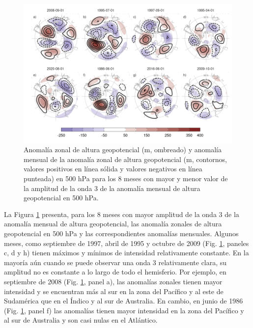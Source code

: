 \documentclass[12pt,oneside,a4paper]{reedthesis}
\begin{document}
\begin{figure}

{\centering \includegraphics{figures/15-onda3/zw3-top8-1} 

}

\caption{Anomalía zonal de altura geopotencial (m, ombreado) y anomalía mensual de la anomalía zonal de altura geopotencial (m, contornos, valores positivos en línea sólida y valores negativos en línea punteada) en 500 hPa para los 8 meses con mayor y menor valor de la amplitud de la onda 3 de la anomalía mensual de altura geopotencial en 500 hPa.}\label{fig:zw3-top8}
\end{figure}



La Figura \ref{fig:zw3-top8} presenta, para los 8 meses con mayor amplitud de la onda 3 de la anomalía mensual de altura geopotencial, las anomalía zonales de altura geopotencial en 500 hPa y las correspondientes anomalías mensuales.
Algunos meses, como septiembre de 1997, abril de 1995 y octubre de 2009 (Fig. \ref{fig:zw3-top8}, paneles c, d y h) tienen máximos y mínimos de intensidad relativamente constante.
En la mayoría aún cuando se puede observar una onda 3 relativamente clara, su amplitud no es constante a lo largo de todo el hemisferio.
Por ejemplo, en septiembre de 2008 (Fig. \ref{fig:zw3-top8}, panel a), las anomalías zonales tienen mayor intensidad y se encuentran más al sur en la zona del Pacífico y al este de Sudamérica que en el Índico y al sur de Australia.
En cambio, en junio de 1986 (Fig. \ref{fig:zw3-top8}, panel f) las anomalías tienen mayor intensidad en la zona del Pacífico y al sur de Australia y son casi nulas en el Atlántico.
\end{document}
